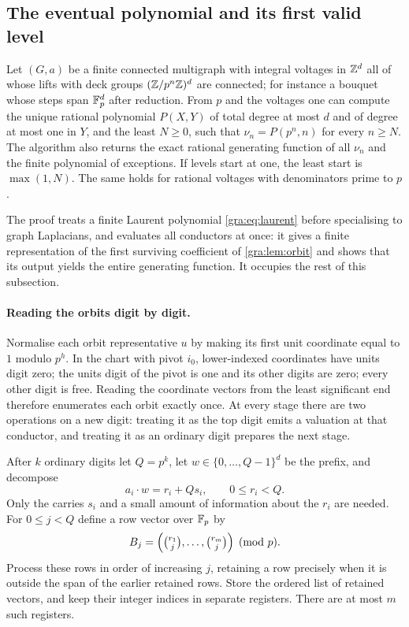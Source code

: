 \subsection{The eventual polynomial and its first valid level}\label{gra:sec:effective}

\begin{theorem}\label{gra:thm:effective}
Let $(G,a)$ be a finite connected multigraph with integral voltages in
$\mathbb{Z}^d$ all of whose lifts with deck groups $(\mathbb{Z}/p^n\mathbb{Z})^d$ are connected;
for instance a bouquet whose steps span $\mathbb{F}_p^d$ after reduction. From $p$
and the voltages one can compute the unique rational polynomial $P(X,Y)$ of
total degree at most $d$ and of degree at most one in $Y$, and the least
$N\ge0$, such that $\nu_n=P(p^n,n)$ for every $n\ge N$. The algorithm also
returns the exact rational generating function of all $\nu_n$ and the
finite polynomial of exceptions. If levels start at one, the least start is
$\max(1,N)$. The same holds for rational voltages with denominators prime
to $p$.
\end{theorem}

The proof treats a finite Laurent polynomial \eqref{gra:eq:laurent} before
specialising to graph Laplacians, and evaluates all conductors at once: it
gives a finite representation of the first surviving coefficient of
\cref{gra:lem:orbit} and shows that its output yields the entire generating
function. It occupies the rest of this subsection.

\paragraph{Reading the orbits digit by digit.}
Normalise each orbit representative $u$ by making its first unit coordinate
equal to $1$ modulo $p^h$. In the chart with pivot $i_0$, lower-indexed
coordinates have units digit zero; the units digit of the pivot is one and
its other digits are zero; every other digit is free. Reading the
coordinate vectors from the least significant end therefore enumerates each
orbit exactly once. At every stage there are two operations on a new digit:
treating it as the top digit emits a valuation at that conductor, and
treating it as an ordinary digit prepares the next stage.

After $k$ ordinary digits let $Q=p^k$, let $w\in\{0,\dots,Q-1\}^d$ be the
prefix, and decompose
\[
 a_i\cdot w=r_i+Qs_i,\qquad 0\le r_i<Q .
\]
Only the carries $s_i$ and a small amount of information about the $r_i$
are needed. For $0\le j<Q$ define a row vector over $\mathbb{F}_p$ by
\[
 B_j=\Bigl(\tbinom{r_1}{j},\dots,\tbinom{r_m}{j}\Bigr)\pmod p .
\]
Process these rows in order of increasing $j$, retaining a row precisely
when it is outside the span of the earlier retained rows. Store the ordered
list of retained vectors, and keep their integer indices in separate
registers. There are at most $m$ such registers.


